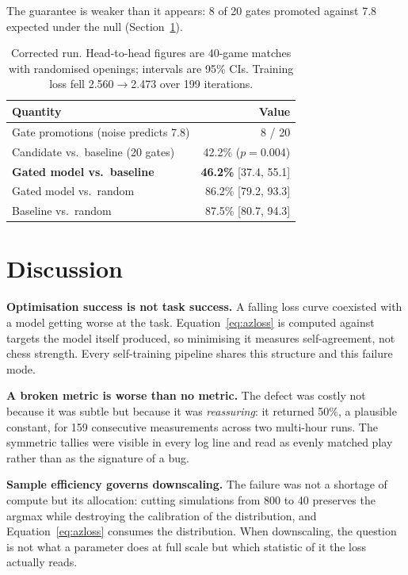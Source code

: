 \documentclass{article}
\begin{document}
The guarantee is weaker than it appears: 8 of 20 gates promoted against
7.8 expected under the null (Section~\ref{sec:discussion}).

\begin{table}[t]
\centering
\caption{Corrected run. Head-to-head figures are 40-game matches with
randomised openings; intervals are 95\% CIs. Training loss fell
2.560$\rightarrow$2.473 over 199 iterations.}
\label{tab:v7}
\begin{tabular}{lr}
\toprule
Quantity & Value \\
\midrule
Gate promotions (noise predicts 7.8) & 8 / 20 \\
Candidate vs.\ baseline (20 gates)   & 42.2\% ($p=0.004$) \\
\textbf{Gated model vs.\ baseline}   & \textbf{46.2\%} [37.4, 55.1] \\
Gated model vs.\ random             & 86.2\% [79.2, 93.3] \\
Baseline vs.\ random                & 87.5\% [80.7, 94.3] \\
\bottomrule
\end{tabular}
\end{table}

\section{Discussion}
\label{sec:discussion}

\noindent\textbf{Optimisation success is not task success.}
A falling loss curve coexisted with a model getting worse at the task.
Equation~\eqref{eq:azloss} is computed against targets the model itself
produced, so minimising it measures self-agreement, not chess strength. Every
self-training pipeline shares this structure and this failure mode.

\noindent\textbf{A broken metric is worse than no metric.}
The defect was costly not because it was subtle but because it was
\emph{reassuring}: it returned 50\%, a plausible constant, for 159
consecutive measurements across two multi-hour runs. The symmetric tallies
were visible in every log line and read as evenly matched play rather than as
the signature of a bug.

\noindent\textbf{Sample efficiency governs downscaling.}
The failure was not a shortage of compute but its allocation: cutting
simulations from 800 to 40 preserves the argmax while destroying the
calibration of the distribution, and Equation~\eqref{eq:azloss} consumes the
distribution. When downscaling, the question is not what a parameter does at
full scale but which statistic of it the loss actually reads.
\end{document}
